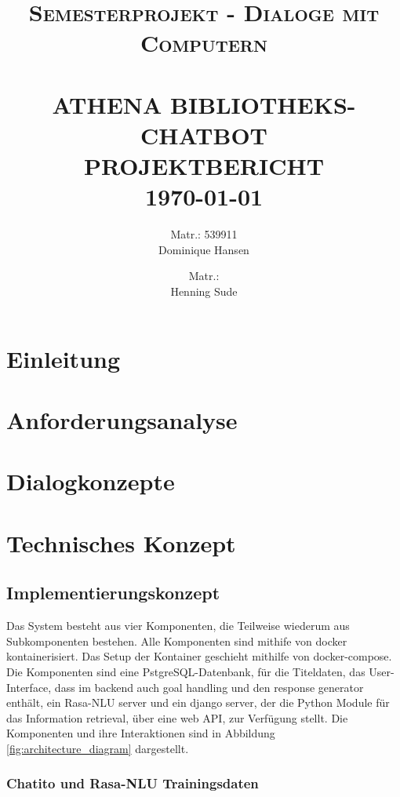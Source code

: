 \documentclass[12pt,a4paper]{article}
\title{ \normalsize \textsc{Semesterprojekt - Dialoge mit Computern}
		\\ [2.0cm]
		\HRule{0.5pt} \\ [0.2cm]
		{\Large \textbf{\uppercase{Athena Bibliotheks-chatbot}}} \\
	    {\large \textbf{\uppercase{Projektbericht}}}
		\HRule{2pt} \\ [0.5cm]
		\normalsize \today \vspace*{5\baselineskip}}
\date{}
\author{
		Matr.: 539911 \\ 
		Dominique Hansen \\
		\and
		Matr.: \\
		Henning Sude \\}
\begin{document}
\maketitle

\clearpage

\tableofcontents
\clearpage


\section{Einleitung}

\section{Anforderungsanalyse}

\section{Dialogkonzepte}


\section{Technisches Konzept}


\subsection{Implementierungskonzept}

Das System besteht aus vier Komponenten, die Teilweise wiederum aus Subkomponenten bestehen.%
Alle Komponenten sind mithife von docker kontainerisiert.
Das Setup der Kontainer geschieht mithilfe von docker-compose.
Die Komponenten sind eine PstgreSQL-Datenbank, für die Titeldaten, das User-Interface, dass im backend auch goal handling und den response generator enthält, ein Rasa-NLU server und ein django server, der die Python Module für das Information retrieval, über eine web API, zur Verfügung stellt.
Die Komponenten und ihre Interaktionen sind in Abbildung \ref{fig:architecture_diagram} dargestellt.


\subsubsection{Chatito und Rasa-NLU Trainingsdaten}
\end{document}
